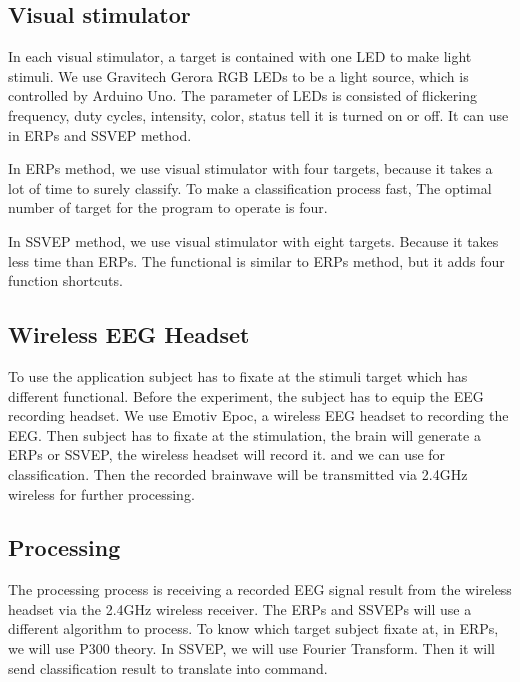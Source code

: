 \subsection{Visual stimulator}

\hspace{1.5cm}In each visual stimulator, a target is contained with one LED to make light stimuli. We use Gravitech Gerora RGB LEDs to be a light source, which is controlled by Arduino Uno.  The parameter of LEDs is consisted of flickering frequency, duty cycles, intensity, color, status tell it is turned on or off. It can use in ERPs and SSVEP method. 

In ERPs method, we use visual stimulator with four targets, because it takes a lot of time to surely classify. To make a classification process fast, The optimal number of target for the program to operate is four.

In SSVEP method, we use visual stimulator with eight targets. Because it takes less time than ERPs. The functional is similar to ERPs method, but it adds four function shortcuts.

\subsection{Wireless EEG Headset}
\hspace{1.5cm}To use the application subject has to fixate at the stimuli target which has different functional. Before the experiment, the subject has to equip the EEG recording headset. We use Emotiv Epoc, a wireless EEG headset to recording the EEG. Then subject has to fixate at the stimulation, the brain will generate a ERPs or SSVEP, the wireless headset will record it. and we can use for classification. Then the recorded brainwave will be transmitted via 2.4GHz wireless for further processing.

\subsection{Processing}
\hspace{1.5cm}The processing process is receiving a recorded EEG signal result from the wireless headset via the 2.4GHz wireless receiver. The ERPs and SSVEPs will use a different algorithm to process. To know which target subject fixate at, in ERPs, we will use P300 theory. In SSVEP, we will use Fourier Transform. Then it will send classification result to translate into command.



